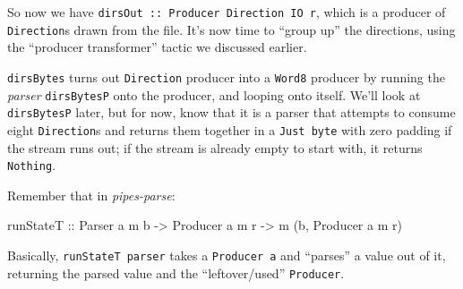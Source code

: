 \documentclass[]{article}
\newenvironment{Shaded}{}{}
\newcommand{\KeywordTok}[1]{\textcolor[rgb]{0.00,0.44,0.13}{\textbf{{#1}}}}
\newcommand{\DataTypeTok}[1]{\textcolor[rgb]{0.56,0.13,0.00}{{#1}}}
\newcommand{\CommentTok}[1]{\textcolor[rgb]{0.38,0.63,0.69}{\textit{{#1}}}}
\newcommand{\OtherTok}[1]{\textcolor[rgb]{0.00,0.44,0.13}{{#1}}}
\newcommand{\FunctionTok}[1]{\textcolor[rgb]{0.02,0.16,0.49}{{#1}}}
\newcommand{\NormalTok}[1]{{#1}}
\begin{document}
So now we have \texttt{dirsOut\ ::\ Producer\ Direction\ IO\ r}, which
is a producer of \texttt{Direction}s drawn from the file. It's now time
to ``group up'' the directions, using the ``producer transformer''
tactic we discussed earlier.

\begin{Shaded}
\end{Shaded}

\texttt{dirsBytes} turns out \texttt{Direction} producer into a
\texttt{Word8} producer by running the \emph{parser} \texttt{dirsBytesP}
onto the producer, and looping onto itself. We'll look at
\texttt{dirsBytesP} later, but for now, know that it is a parser that
attempts to consume eight \texttt{Direction}s and returns them together
in a \texttt{Just\ byte} with zero padding if the stream runs out; if
the stream is already empty to start with, it returns \texttt{Nothing}.

Remember that in \emph{pipes-parse}:

\begin{Shaded}
\begin{Highlighting}[]
\OtherTok{runStateT ::} \DataTypeTok{Parser} \NormalTok{a m b }\OtherTok{->} \DataTypeTok{Producer} \NormalTok{a m r }\OtherTok{->} \NormalTok{m (b, }\DataTypeTok{Producer} \NormalTok{a m r)}
\end{Highlighting}
\end{Shaded}

Basically, \texttt{runStateT\ parser} takes a \texttt{Producer\ a} and
``parses'' a value out of it, returning the parsed value and the
``leftover/used'' \texttt{Producer}.
\end{document}

